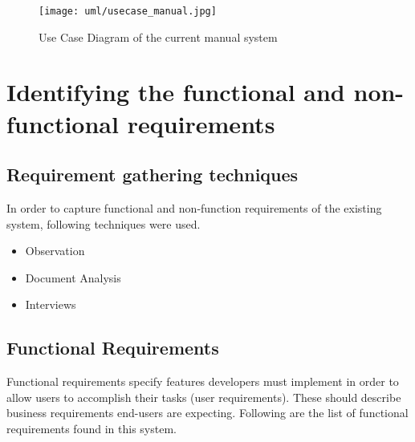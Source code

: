 \documentclass[12pt]{report}
\begin{document}
\begin{figure}[H]
	\centering
	\texttt{[image: uml/usecase\_manual.jpg]}
	\caption{Use Case Diagram of the current manual system}
\end{figure}

\section{Identifying the functional and non-functional requirements}

\subsection{Requirement gathering techniques}
In order to capture functional and non-function requirements of the existing system, following techniques were used.

\begin{itemize}
	\item Observation
	\item Document Analysis
	\item Interviews
\end{itemize}

\subsection{Functional Requirements}
Functional requirements specify features developers must implement in order to allow users to accomplish their tasks (user requirements).  These should describe business requirements end-users are expecting. Following are the list of functional requirements found in this system.
\end{document}
